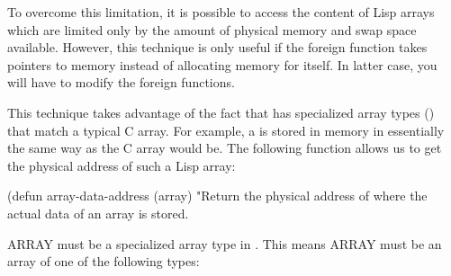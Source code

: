 To overcome this limitation, it is possible to access the content of
Lisp arrays which are limited only by the amount of physical memory
and swap space available.  However, this technique is only useful if
the foreign function takes pointers to memory instead of allocating
memory for itself.  In latter case, you will have to modify the
foreign functions.

This technique takes advantage of the fact that \cmucl{} has
specialized array types () that match
a typical C array.  For example, a  is stored in memory in essentially the same way as the C
array  would be.  The following function allows us
to get the physical address of such a Lisp array:

\begin{example}
(defun array-data-address (array)
  "Return the physical address of where the actual data of an array is
stored.

ARRAY must be a specialized array type in \cmucl{}.  This means ARRAY
must be an array of one of the following types:


\end{example}
